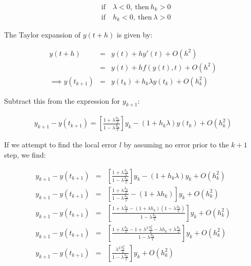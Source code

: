 \documentclass[a4paper,12pt]{article}
\begin{document}
\begin{eqnarray}
&\mathrm{if}&\: \lambda < 0,\:\mathrm{then}\:h_k > 0\nonumber\\
&\mathrm{if}&\: h_k < 0,\:\mathrm{then}\:\lambda > 0\nonumber
\end{eqnarray}



The Taylor expansion of $y(t + h)$ is given by:

\begin{eqnarray}
y(t+h) &=& y(t) + hy'(t) + O(h^2) \nonumber\\
	   &=& y(t) + hf(y(t),t) + O(h^2)\nonumber\\
\implies y(t_{k+1}) &=& y(t_k) + h_k\lambda y(t_k) + O(h_k^2)\nonumber
\end{eqnarray}

Subtract this from the expression for $y_{k+1}$:

\begin{eqnarray}
y_{k+1} - y(t_{k+1}) = \left[\frac{1 + \lambda\frac{h_k}{2}}{1 - \lambda\frac{h_k}{2}}\right]y_k - (1+h_k\lambda)y(t_k) + O(h_k^2)\nonumber
\end{eqnarray}

If we attempt to find the local error $l$ by assuming no error prior to the $k+1$ step, we find:

\begin{eqnarray}
y_{k+1} - y(t_{k+1}) &=& \left[\frac{1 + \lambda\frac{h_k}{2}}{1 - \lambda\frac{h_k}{2}}\right]y_k - (1+h_k\lambda)y_k + O(h_k^2)\nonumber\\
y_{k+1} - y(t_{k+1}) &=& \left[\frac{1 + \lambda\frac{h_k}{2}}{1 - \lambda\frac{h_k}{2}} - (1+\lambda h_k)\right]y_k + O(h^2_k)\nonumber\\
y_{k+1} - y(t_{k+1}) &=& \left[\frac{1 + \lambda\frac{h_k}{2} - (1+\lambda h_k)(1-\lambda\frac{h_k}{2})}{1-\lambda\frac{h_k}{2}}\right]y_k + O(h_k^2)\nonumber\\
y_{k+1} - y(t_{k+1}) &=& \left[\frac{1 + \lambda\frac{h_k}{2} - 1 + \lambda^2\frac{h_k^2}{2} - \lambda h_k + \lambda\frac{h_k}{2}}{1-\lambda\frac{h_k}{2}}\right]y_k + O(h_k^2)\nonumber\\
y_{k+1} - y(t_{k+1}) &=& \left[ \frac{\lambda^2\frac{h_k^2}{2}}{1-\lambda\frac{h_k}{2}}\right]y_k + O(h_k^2)
\label{eqn:local}
\end{eqnarray}
\end{document}
